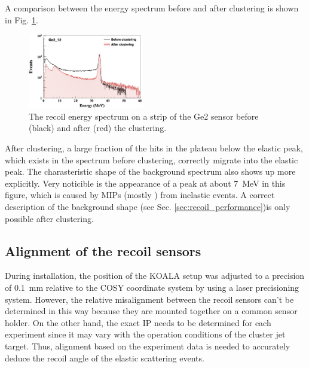 \documentclass[number,5p]{elsarticle}
\begin{document}
A comparison between the energy spectrum before and after clustering is shown in
Fig. \ref{fig:clustering}.
\begin{figure}[b!]
  \centering
  \includegraphics[width=0.45\textwidth]{./clustering.png}
  \caption{The recoil energy spectrum on a strip of the Ge2 sensor before (black) and after (red) the clustering.}
  \label{fig:clustering}
\end{figure}
After clustering, a large fraction of the hits in the plateau below the elastic peak, which exists in the spectrum before clustering, correctly migrate into the elastic peak.
The charasteristic shape of the background spectrum also shows up more explicitly.
Very noticible is the appearance of a peak at about \SI{7}{\MeV} in this figure,
which is caused by MIPs (mostly \Pgpp) from inelastic events.
A correct description of the background shape (see Sec. \ref{sec:recoil_performance})is only possible after clustering.

\subsection{Alignment of the recoil sensors}
\label{sec:alignment}

During installation, the position of the KOALA setup was adjusted to a precision
of \SI{0.1}{\mm} relative to the COSY coordinate system by using a laser precisioning system.
However, the relative misalignment between the recoil sensors can't be
determined in this way because they are mounted together on a common sensor holder.
On the other hand, the exact IP needs to be determined for each experiment since
it may vary with the operation conditions of the cluster jet target.
Thus, alignment based on the experiment data is needed to accurately deduce the recoil angle of the elastic scattering events.
\end{document}
